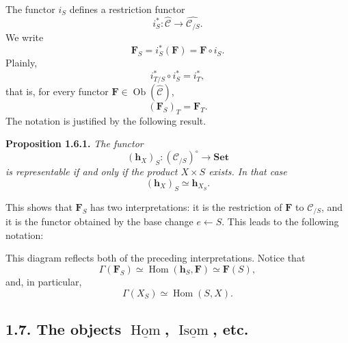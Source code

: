 The functor \(i_S\) defines a restriction functor
\[
  i_S^*:\widehat{\mathscr C}\longrightarrow
    \widehat{\mathscr C_{/S}}.
\]
We write
\[
  \mathbf F_S=i_S^*(\mathbf F)=\mathbf F\circ i_S.
\]
Plainly,
\[
  i_{T/S}^*\circ i_S^*=i_T^*,
\]
that is, for every functor
\(\mathbf F\in\operatorname{Ob}(\widehat{\mathscr C})\),
\[
  (\mathbf F_S)_T=\mathbf F_T.
\]
The notation is justified by the following result.

\medskip
\noindent{}\textbf{Proposition 1.6.1.}
\textit{The functor
\[
  (\mathbf h_X)_S:(\mathscr C_{/S})^{\circ}\longrightarrow\mathbf{Set}
\]
is representable if and only if the product \(X\times S\) exists. In that
case
\[
  (\mathbf h_X)_S\simeq\mathbf h_{X_S}.
\]}

This shows that \(\mathbf F_S\) has two interpretations: it is the
restriction of \(\mathbf F\) to \(\mathscr C_{/S}\), and it is the functor
obtained by the base change \(e\leftarrow S\). This leads to the following
notation:

\begin{center}
  
\end{center}

This diagram reflects both of the preceding interpretations. Notice that
\[
  \Gamma(\mathbf F_S)
    \simeq\operatorname{Hom}(\mathbf h_S,\mathbf F)
    \simeq\mathbf F(S),
\]
and, in particular,
\[
  \Gamma(X_S)\simeq\operatorname{Hom}(S,X).
\]

\subsection*{1.7. The objects \(\underline{\operatorname{Hom}}\),
\(\underline{\operatorname{Isom}}\), etc.}


